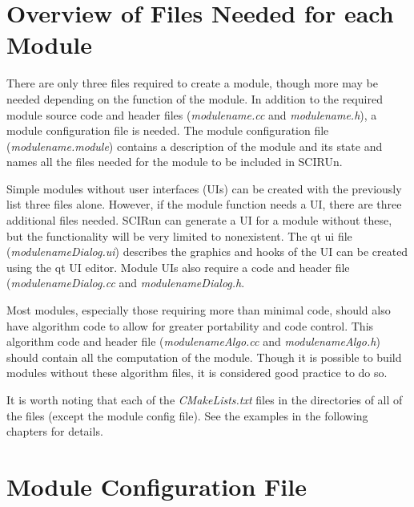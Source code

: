 \documentclass[fleqn,11pt,openany]{book}
\begin{document}
\section{Overview of Files Needed for each Module}
\label{sec:overview}

There are only three files required to create a module, though more may be needed depending on the function of the module.
In addition to the required module source code and header files (\emph{modulename.cc} and \emph{modulename.h}), a module configuration file is needed.
The module configuration file (\emph{modulename.module}) contains a description of the module and its state and names all the files needed for the module to be included in SCIRUn.  

Simple modules without user interfaces (UIs) can be created with the previously list three files alone.
However, if the module function needs a UI, there are three additional files needed.  
SCIRun can generate a UI for a module without these, but the functionality will be very limited to nonexistent.  
The qt ui file (\emph{modulenameDialog.ui}) describes the graphics and hooks of the UI can be created using the qt UI editor.
Module UIs also require a code and header file (\emph{modulenameDialog.cc} and \emph{modulenameDialog.h}.

Most modules, especially those requiring more than minimal code, should also have algorithm code to allow for greater portability and code control.  
This algorithm code and header file (\emph{modulenameAlgo.cc} and \emph{modulenameAlgo.h}) should contain all the computation of the module.
Though it is possible to build modules without these algorithm files, it is considered good practice to do so.

It is worth noting that each of the \emph{CMakeLists.txt} files in the directories of all of the files (except the module config file).  
See the examples in the following chapters for details.  %


\section{Module Configuration File}
\label{sec:config}
\end{document}
